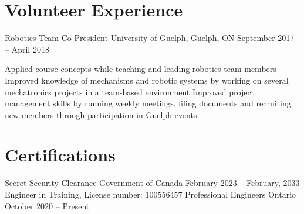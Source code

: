 \documentclass[a4paper,11pt]{article}
\begin{document}
\section{Volunteer Experience}
\begin{subheading}

	\resumeExp
	{Robotics Team Co-President}
	{University of Guelph, Guelph, ON}
	{September 2017 -- April 2018} %
	{}
	\begin{entries}
		\ib Applied course concepts while teaching and leading robotics team members
		\ib Improved knowledge of mechanisms and robotic systems by working on several mechatronics
		projects in a team-based environment
		\ib Improved project management skills by running weekly meetings, filing documents and
		recruiting new members through participation in Guelph events
	\end{entries}
\end{subheading}

\section{Certifications}
\begin{subheading}

	\resumeCert
	{Secret Security Clearance}
	{Government of Canada}
	{February 2023 -- February, 2033}
	\resumeCert
	{Engineer in Training, License number: 100556457}
	{Professional Engineers Ontario}
	{October 2020 -- Present}
\end{subheading}

% 
\end{document}
